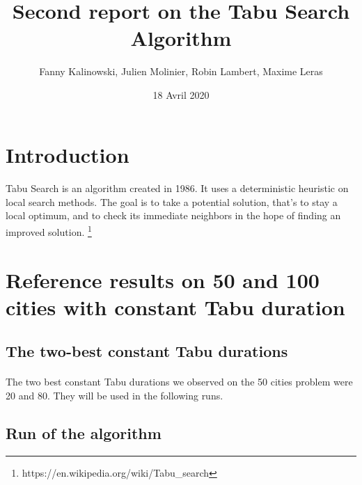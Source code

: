 \documentclass[12pt,oneside,a4paper]{article}
\begin{document}
\title{Second report on the Tabu Search Algorithm}
\author{Fanny Kalinowski, Julien Molinier, Robin Lambert, Maxime Leras}
\date{18 Avril 2020}
\maketitle\thispagestyle{empty}

\newpage    
\clearpage
\thispagestyle{empty}
\renewcommand*\contentsname{Sommaire}
\tableofcontents
\newpage

\pagestyle{fancy}
\cfoot{\thepage}
\fancyhead{}
\fancyhead[R]{\leftmark}

\section{Introduction}
\paragraph{}
    Tabu Search is an algorithm created in 1986. It uses a deterministic heuristic on
    local search methods. The goal is to take a potential solution, that's to stay a local optimum,  
    and to check its immediate neighbors in the hope of finding an improved solution.
    \footnote{https://en.wikipedia.org/wiki/Tabu\_search}

\section{Reference results on 50 and 100 cities with constant Tabu duration}
\subsection{The two-best constant Tabu durations}
\paragraph{}
The two best constant Tabu durations we observed on the 50 cities problem were 20 and 80.
They will be used in the following runs.
\subsection{Run of the algorithm}
\end{document}
